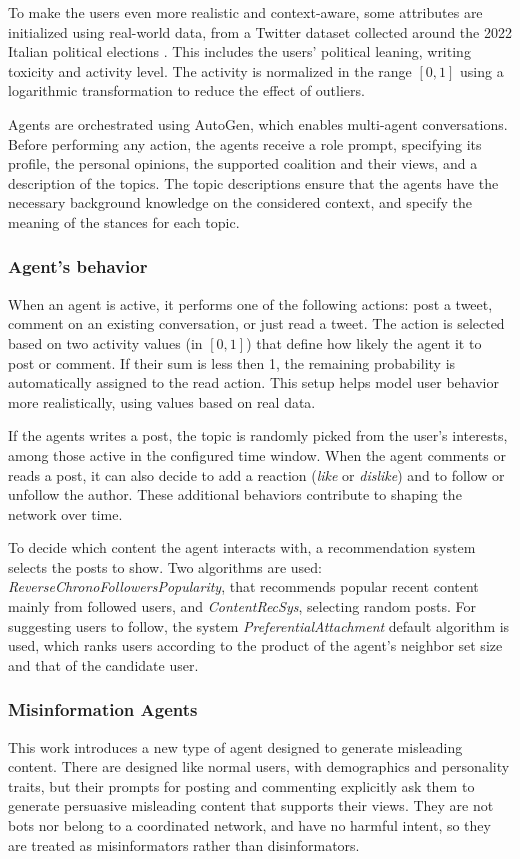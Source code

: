 To make the users even more realistic and context-aware, some attributes are initialized using real-world data, from a Twitter dataset collected around the 2022 Italian political elections \cite{pierri2023ita}.
This includes the users' political leaning, writing toxicity and activity level.
The activity is normalized in the range $[0,1]$ using a logarithmic transformation to reduce the effect of outliers.

Agents are orchestrated using AutoGen, which enables multi-agent conversations.
Before performing any action, the agents receive a role prompt, specifying its profile, the personal opinions, the supported coalition and their views, and a description of the topics.
The topic descriptions ensure that the agents have the necessary background knowledge on the considered context, and specify the meaning of the stances for each topic.


\subsubsection{Agent's behavior}
When an agent is active, it performs one of the following actions: post a tweet, comment on an existing conversation, or just read a tweet.
The action is selected based on two activity values (in $[0,1]$) that define how likely the agent it to post or comment.
If their sum is less then 1, the remaining probability is automatically assigned to the read action.
This setup helps model user behavior more realistically, using values based on real data.

If the agents writes a post, the topic is randomly picked from the user's interests, among those active in the configured time window.
When the agent comments or reads a post, it can also decide to add a reaction (\textit{like} or \textit{dislike}) and to follow or unfollow the author.
These additional behaviors contribute to shaping the network over time.

To decide which content the agent interacts with, a recommendation system selects the posts to show. Two algorithms are used: \textit{ReverseChronoFollowersPopularity}, that recommends popular recent content mainly from followed users, and \textit{ContentRecSys}, selecting random posts.
For suggesting users to follow, the system \textit{PreferentialAttachment} default algorithm is used, which ranks users according to the product of the agent’s neighbor set size and that of the candidate user.


\subsubsection{Misinformation Agents}
This work introduces a new type of agent designed to generate misleading content.
There are designed like normal users, with demographics and personality traits, but their prompts for posting and commenting explicitly ask them to generate persuasive misleading content that supports their views.
They are not bots nor belong to a coordinated network, and have no harmful intent, so they are treated as misinformators rather than disinformators.

